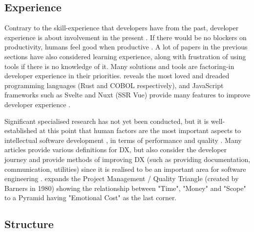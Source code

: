 \documentclass{mprop}
\begin{document}
\subsection{Experience}

Contrary to the skill-experience that developers have from the past, developer experience is about involvement in the present \cite{fagerholmDeveloperExperienceConcept2012}. If there would be no blockers on productivity, humans feel good when productive \cite{WhyDoesProductivity,beechamMotivationSoftwareEngineering2008,graziotinFeelingsMatterCorrelation2015,amabileProgressPrincipleUsing2011,meyerSoftwareDevelopersPerceptions2014,mullerStuckFrustratedFlow2015,khanMoodsAffectProgrammers2011}. A lot of papers in the previous sections have also considered learning experience, along with frustration of using tools if there is no knowledge of it. Many solutions and tools are factoring-in developer experience in their priorities. \textcite{StackOverflowDeveloper} reveals the most loved and dreaded programming languages (Rust and COBOL respectively), and JavaScript frameworks such as Svelte \cite{SvelteCyberneticallyEnhanced} and Nuxt \cite{NuxtIntuitiveWeb} (SSR Vue) provide many features to improve developer experience \cite{StateJS2021}.

Significant specialised research has not yet been conducted, but it is well-established at this point that human factors are the most important aspects to intellectual software development \cite{endresHandbookSoftwareSystems2003}, in terms of performance \cite{sackmanExploratoryExperimentalStudies1968,demarcoProgrammerPerformanceEffects1985} and quality \cite{mockusOrganizationalVolatilityIts2010,trendowiczChapterFactorsInfluencing2009,birdPuttingItAll2009,nagappanInfluenceOrganizationalStructure2008}. Many articles provide various definitions for DX, but also consider the developer journey and provide methods of improving DX (such as providing documentation, communication, utilities) since it is realised to be an important area for software engineering \cite{fagerholmDeveloperExperienceConcept2012,DeveloperExperienceDevEx,cavalcanteWhatDXDeveloper2021,doerrfeldWhatDeveloperExperience2022,WhatDeveloperExperience}. \textcite{GoodDeveloperExperience} expands the Project Management / Quality Triangle (created by Barners in 1980) \cite{ProjectManagementTriangle,ProjectTriangleMicrosoft} showing the relationship between "Time", "Money" and "Scope" to a Pyramid having "Emotional Cost" as the last corner.

\subsection{Structure}%
\end{document}
